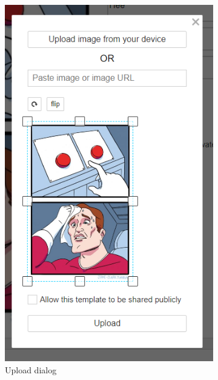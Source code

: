 \begin{figure}\ContinuedFloat
    \begin{subfigure}{0.4\textwidth}
        \centering
        \includegraphics[width=\linewidth]{text/img/imgflip/upload-dialog.png}
        \caption{Upload dialog}
        \label{fig:imgflip-upload-dialog}
    \end{subfigure}
    \begin{subfigure}{0.4\textwidth}
        \centering

\end{subfigure}
\end{figure}

